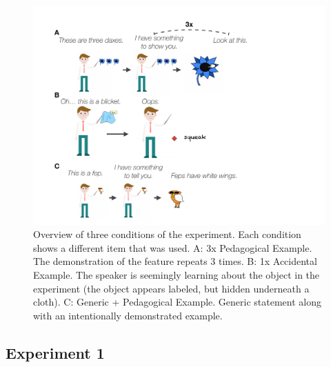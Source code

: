 \documentclass[10pt,letterpaper]{article}
\begin{document}
\begin{figure}[t]
\begin{center}
\includegraphics[width=\linewidth]{figs/expt-cartoon.pdf}
\end{center}
\caption{Overview of three conditions of the experiment. Each condition shows a different item that was used. A: 3x Pedagogical Example. The demonstration of the feature repeats 3 times. B: 1x Accidental Example. The speaker is seemingly learning about the object in the experiment (the object appears labeled, but hidden underneath a cloth). C: Generic + Pedagogical Example. Generic statement along with an intentionally demonstrated example.}
\label{fig:expt}
\end{figure}


\subsection{Experiment 1}

\end{document}
